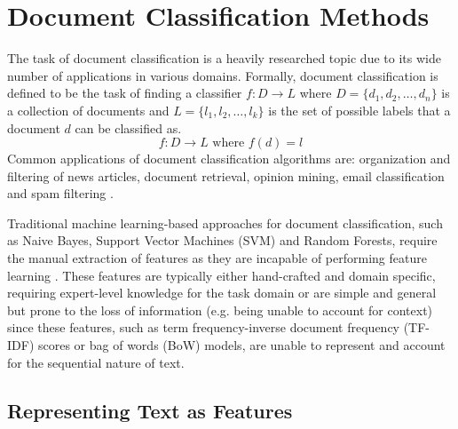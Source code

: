 \documentclass[a4paper,twoside,phd]{BYUPhys}
\begin{document}
\section{Document Classification Methods}
\label{sec:DocumentClassification}

The task of document classification is a heavily researched topic due to its wide number of applications in various domains. Formally, document classification is defined to be the task of finding a classifier $f: D \rightarrow L$ where $D = \{d_1, d_2, \dots, d_n\} $ is a collection of documents and $L = \{l_1, l_2,\dots, l_k\}$ is the set of possible labels that a document $d$ can be classified as. 
\begin{equation}
\label{eq:TextClassification}
f: D \rightarrow L \text{ where } f(d) = l
\end{equation}
Common applications of document classification algorithms are: organization and filtering of news articles, document retrieval, opinion mining, email classification and spam filtering \cite{Aggarwal2012}.

Traditional machine learning-based approaches for document classification, such as Naive Bayes, Support Vector Machines (SVM) and Random Forests, require the manual extraction of features \cite{Aggarwal2012} \cite{Allahyari2017} \cite{Korde2012} \cite{Pasupa2016} as they are incapable of performing feature learning \cite{Basheer2000}. These features are typically either hand-crafted and domain specific, requiring expert-level knowledge for the task domain \cite{Pasupa2016} or are simple and general but prone to the loss of information (e.g. being unable to account for context) since these features, such as term frequency-inverse document frequency (TF-IDF) scores or bag of words (BoW) models, are unable to represent and account for the sequential nature of text.

\subsection{Representing Text as Features}
\label{sec:TextRepresentations}
\end{document}
